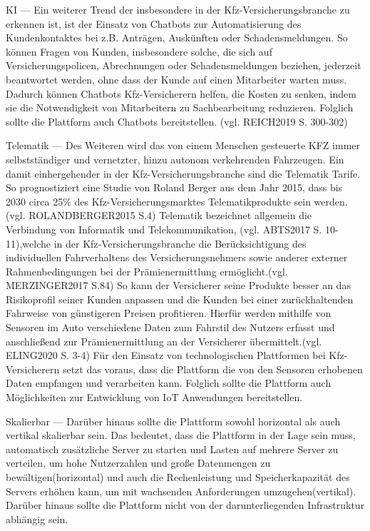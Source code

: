 KI --- Ein weiterer Trend der insbesondere in der Kfz-Versicherungsbranche zu erkennen ist, ist der Einsatz von Chatbots zur Automatisierung des Kundenkontaktes bei z.B. Anträgen, Auskünften oder Schadensmeldungen. So können Fragen von Kunden, insbesondere solche, die sich auf Versicherungspolicen, Abrechnungen oder Schadensmeldungen beziehen, jederzeit beantwortet werden, ohne dass der Kunde auf einen Mitarbeiter warten muss. Dadurch können Chatbots Kfz-Versicherern helfen, die Kosten zu senken, indem sie die Notwendigkeit von Mitarbeitern zu Sachbearbeitung reduzieren. Folglich sollte die Plattform auch Chatbots bereitstellen. (vgl. REICH2019 S. 300-302)

Telematik --- Des Weiteren wird das von einem Menschen gesteuerte KFZ immer selbstständiger und vernetzter, hinzu autonom verkehrenden Fahrzeugen. Ein damit einhergehender in der Kfz-Versicherungsbranche sind die Telematik Tarife. So prognostiziert eine Studie von Roland Berger aus dem Jahr 2015, dass bis 2030 circa 25\% des Kfz-Versicherungsmarktes Telematikprodukte sein werden.(vgl. ROLANDBERGER2015 S.4) Telematik bezeichnet allgemein die Verbindung von Informatik und Telekommunikation, (vgl. ABTS2017 S. 10-11),welche in der Kfz-Versicherungsbranche die Berücksichtigung des individuellen Fahrverhaltens des Versicherungsnehmers sowie anderer externer Rahmenbedingungen bei der Prämienermittlung ermöglicht.(vgl. MERZINGER2017 S.84) So kann der Versicherer seine Produkte besser an das Risikoprofil seiner Kunden anpassen und die Kunden bei einer zurückhaltenden Fahrweise von günstigeren Preisen profitieren. Hierfür werden mithilfe von Sensoren im Auto verschiedene Daten zum Fahrstil des Nutzers erfasst und anschließend zur Prämienermittlung an der Versicherer übermittelt.(vgl. ELING2020 S. 3-4) Für den Einsatz von technologischen Plattformen bei Kfz-Versicherern setzt das voraus, dass die Plattform die von den Sensoren erhobenen Daten empfangen und verarbeiten kann. Folglich sollte die Plattform auch Möglichkeiten zur Entwicklung von IoT Anwendungen bereitstellen.

Skalierbar --- Darüber hinaus sollte die Plattform sowohl horizontal als auch vertikal skalierbar sein. Das bedeutet, dass die Plattform in der Lage sein muss, automatisch zusätzliche Server zu starten und Lasten auf mehrere Server zu verteilen, um hohe Nutzerzahlen und große Datenmengen zu bewältigen(horizontal) und auch die Rechenleistung und Speicherkapazität des Servers erhöhen kann, um mit wachsenden Anforderungen umzugehen(vertikal).
Darüber hinaus sollte die Plattform nicht von der darunterliegenden Infrastruktur abhängig sein.

